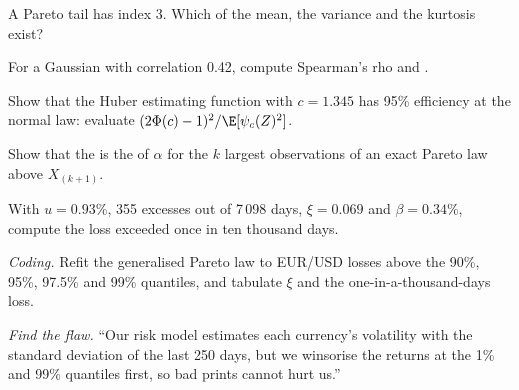 \begin{exercise}[$\star$]\label{exo:qm:robust-statistics-and-heavy-tails:2}
A Pareto tail has index 3. Which of the mean, the variance and the kurtosis exist?
\end{exercise}

\begin{exercise}[$\star$]\label{exo:qm:robust-statistics-and-heavy-tails:3}
For a Gaussian  with correlation 0.42, compute Spearman's rho and .
\end{exercise}

\begin{exercise}[$\star\star$]\label{exo:qm:robust-statistics-and-heavy-tails:4}
Show that the Huber estimating function with $c = 1.345$ has 95\% efficiency at the normal law: evaluate $(2\Phi(c) - 1)^2/\E[\psi_c(Z)^2]$.
\end{exercise}

\begin{exercise}[$\star\star$]\label{exo:qm:robust-statistics-and-heavy-tails:5}
Show that the  is the  of $\alpha$ for the $k$ largest observations of an exact Pareto law above
$X_{(k+1)}$.
\end{exercise}

\begin{exercise}[$\star\star$]\label{exo:qm:robust-statistics-and-heavy-tails:6}
With $u = 0.93\%$, 355 excesses out of 7\,098 days, $\xi = 0.069$ and $\beta = 0.34\%$, compute the loss exceeded once in ten thousand days.
\end{exercise}

\begin{exercise}[$\star\star\star$]\label{exo:qm:robust-statistics-and-heavy-tails:7}
\emph{Coding.} Refit the generalised Pareto law to EUR/USD losses above the 90\%, 95\%, 97.5\% and 99\% quantiles, and tabulate $\xi$ and the
one-in-a-thousand-days loss.
\end{exercise}

\begin{exercise}[$\star\star\star$]\label{exo:qm:robust-statistics-and-heavy-tails:8}
\emph{Find the flaw.} ``Our risk model estimates each currency's volatility with the standard deviation of the last 250 days, but we
winsorise the returns at the 1\% and 99\% quantiles first, so bad prints cannot hurt us.''
\end{exercise}

